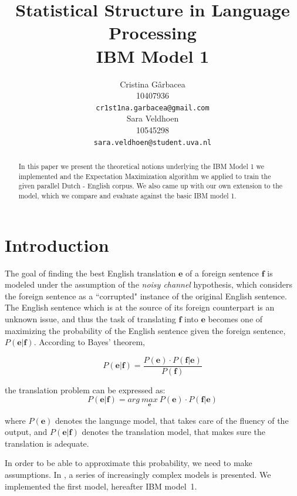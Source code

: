 \documentclass[11pt]{article}
\title{Statistical Structure in Language Processing \\ IBM Model 1}
\author{ Cristina G\^arbacea\\
  10407936 \\
  {\small \tt cr1st1na.garbacea@gmail.com} 
  \\\And
  Sara Veldhoen \\
10545298   \\
  {\small \tt sara.veldhoen@student.uva.nl} \\}
\date{}
\renewcommand{\vec}[1]{\mathbf{#1}}
\begin{document}
\maketitle

\begin{abstract}
In this paper we present the theoretical notions underlying the IBM Model 1 we implemented and the Expectation Maximization algorithm we applied to train the given parallel Dutch - English corpus. 
We also came up with our own extension to the model, which we compare and evaluate against the basic IBM model 1. 
\end{abstract}

\section{Introduction}
The goal of finding the best English translation $\vec{e}$ of a foreign sentence $\vec{f}$ is modeled under the assumption of the \textit{noisy channel} hypothesis, which considers the foreign sentence as a ``corrupted" instance of the original English sentence. The English sentence which is at the source of its foreign counterpart is an unknown issue, and thus the task of translating $\vec{f}$ into $\vec{e}$ becomes one of maximizing the probability of the English sentence given the foreign sentence, $P(\vec{e}|\vec{f})$. According to Bayes' theorem, 

\begin{equation}
P(\vec{e}|\vec{f})= \frac{P(\vec{e})\cdot P(\vec{f}|\vec{e})}{P(\vec{f})}
\end{equation}

the translation problem can be expressed as:
\begin{equation}
P(\vec{e}|\vec{f})= arg \ \underset{\vec{e}}{max} \ P(\vec{e})\cdot P(\vec{f}|\vec{e})
\end{equation}

where $P(\vec{e})$ denotes the language model, that takes care of the fluency of the output, 
 and $P(\vec{e}|\vec{f})$ denotes the translation model, that makes sure the translation is adequate. 

In order to be able to approximate this probability, we need to make assumptions. In %
\cite{Koehn:2010}, \cite{Brown:2010} a series of increasingly complex models is presented. We implemented the first model, hereafter IBM model~1. 
\end{document}
